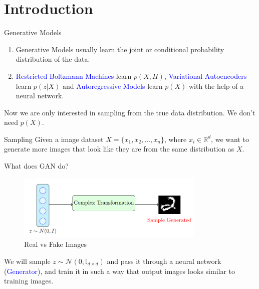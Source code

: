 \section*{Introduction}
\begin{frame}{Generative Models}
    \begin{enumerate}
        \item Generative Models usually learn the joint or conditional probability distribution of the data.
        \item \textcolor{blue}{Restricted Boltzmann Machines} learn $p(X,H)$, \textcolor{blue}{Variational Autoencoders} learn $p(z|X)$ and \textcolor{blue}{Autoregressive Models} learn $p(X)$ with the help of a neural network.
    \end{enumerate}
    Now we are only interested in sampling from the true data distribution. We don't need $p(X)$.
\end{frame}

\begin{frame}{Sampling}
    Given a image dataset $X = \{x_1, x_2, \ldots, x_n\}$, where $x_i \in \mathbb{R}^d$, we want to generate more images that look like they are from the same distribution as $X$.
\end{frame}

\begin{frame}{What does GAN do?}
    \begin{figure}
        \centering
        \includegraphics[width=0.8\textwidth]{../Images/gan1.png}
        \caption{Real vs Fake Images}
    \end{figure}

    We will sample $z \sim \mathcal{N}(0,\mathbb{I}_{d \times d})$ and pass it through a neural network (\textcolor{blue}{Generator}), and train it in such a way that output images looks similar to training images.
\end{frame}

